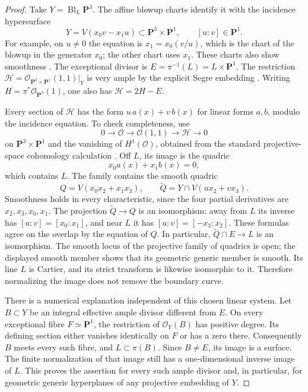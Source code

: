 \begin{proof}
Take $Y=\operatorname{Bl}_L\mathbf P^3$.  The affine blowup
charts identify it with the incidence hypersurface
\[
 Y=V(x_0v-x_1u)\subset\mathbf P^3\times\mathbf P^1,
 \qquad [u:v]\in\mathbf P^1.
\]
For example, on $u\ne0$ the equation is $x_1=x_0(v/u)$,
which is the chart of the blowup in the generator $x_0$;
the other chart uses $x_1$.  These charts also show smoothness
\cite[Tag 0804, Lemma 31.33.2]{StacksDChowSection}.
The exceptional divisor is
$E=\pi^{-1}(L)=L\times\mathbf P^1$.
The restriction
$\mathcal H=\mathcal O_{\mathbf P^3\times\mathbf P^1}(1,1)|_Y$
is very ample by the explicit Segre embedding
\cite[Tag 01WD, Lemma 27.13.6]{StacksDChowSection}.
Writing $H=\pi^*\mathcal O_{\mathbf P^3}(1)$, one also has
$\mathcal H=2H-E$.

Every section of $\mathcal H$ has the form
$u\,a(x)+v\,b(x)$ for linear forms $a,b$, modulo the incidence
equation.  To check completeness, use
\[
 0\longrightarrow\mathcal O
 \longrightarrow\mathcal O(1,1)
 \longrightarrow\mathcal H\longrightarrow0
\]
on $\mathbf P^3\times\mathbf P^1$ and the vanishing of
$H^1(\mathcal O)$, obtained from the standard projective-space
cohomology calculation
\cite[Tag 01XT, Lemma 30.8.1]{StacksDChowSection}.
Off $L$, its image is the quadric
\[
                 x_0a(x)+x_1b(x)=0,
\]
which contains $L$.
The family contains the smooth quadric
\[
 Q=V(x_0x_2+x_1x_3),\qquad
 \widetilde Q=Y\cap V(ux_2+vx_3).
\]
Smoothness holds in every characteristic, since the four
partial derivatives are $x_2,x_3,x_0,x_1$.  The projection
$\widetilde Q\to Q$ is an isomorphism: away from $L$ its
inverse has $[u:v]=[x_0:x_1]$, and near $L$ it has
$[u:v]=[-x_3:x_2]$.  These formulas agree on the overlap by
the equation of $Q$.  In particular,
$\widetilde Q\cap E\to L$ is an isomorphism.
The smooth locus of the projective family of quadrics is
open; the displayed smooth member shows that its geometric
generic member is smooth.  Its line $L$ is Cartier, and its
strict transform is likewise isomorphic to it.  Therefore
normalizing the image does not remove the boundary curve.

There is a numerical explanation independent of this chosen
linear system.  Let $B\subset Y$ be an integral effective
ample divisor different from $E$.  On every exceptional
fibre $F\simeq\mathbf P^1$, the restriction of
$\mathcal O_Y(B)$ has positive degree.  Its defining section
either vanishes identically on $F$ or has a zero there.
Consequently $B$ meets every such fibre, and
$L\subset\pi(B)$.  Since $B\ne E$, its image is a surface.
The finite normalization of that image still has a
one-dimensional inverse image of $L$.  This proves the
assertion for every such ample divisor and, in particular,
for geometric generic hyperplanes of any projective
embedding of $Y$.
\end{proof}

